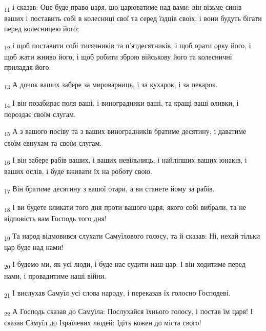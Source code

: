 \begin{tcolorbox}
\textsubscript{11} і сказав: Оце буде право царя, що царюватиме над вами: він візьме синів ваших і поставить собі в колесниці свої та серед їздців своїх, і вони будуть бігати перед колесницею його;
\end{tcolorbox}
\begin{tcolorbox}
\textsubscript{12} і щоб поставити собі тисячників та п'ятдесятників, і щоб орати орку його, і щоб жати жниво його, і щоб робити зброю військову його та колесничні приладдя його.
\end{tcolorbox}
\begin{tcolorbox}
\textsubscript{13} А дочок ваших забере за мироварниць, і за кухарок, і за пекарок.
\end{tcolorbox}
\begin{tcolorbox}
\textsubscript{14} І він позабирає поля ваші, і виноградники ваші, та кращі ваші оливки, і пороздає своїм слугам.
\end{tcolorbox}
\begin{tcolorbox}
\textsubscript{15} А з вашого посіву та з ваших виноградників братиме десятину, і даватиме своїм евнухам та своїм слугам.
\end{tcolorbox}
\begin{tcolorbox}
\textsubscript{16} І він забере рабів ваших, і ваших невільниць, і найліпших ваших юнаків, і ваших ослів, і буде вживати їх на роботу свою.
\end{tcolorbox}
\begin{tcolorbox}
\textsubscript{17} Він братиме десятину з вашої отари, а ви станете йому за рабів.
\end{tcolorbox}
\begin{tcolorbox}
\textsubscript{18} І ви будете кликати того дня проти вашого царя, якого собі вибрали, та не відповість вам Господь того дня!
\end{tcolorbox}
\begin{tcolorbox}
\textsubscript{19} Та народ відмовився слухати Самуїлового голосу, та й сказав: Ні, нехай тільки цар буде над нами!
\end{tcolorbox}
\begin{tcolorbox}
\textsubscript{20} І будемо ми, як усі люди, і буде нас судити наш цар. І він ходитиме перед нами, і провадитиме наші війни.
\end{tcolorbox}
\begin{tcolorbox}
\textsubscript{21} І вислухав Самуїл усі слова народу, і переказав їх голосно Господеві.
\end{tcolorbox}
\begin{tcolorbox}
\textsubscript{22} А Господь сказав до Самуїла: Послухайся їхнього голосу, і постав їм царя! І сказав Самуїл до Ізраїлевих людей: Ідіть кожен до міста свого!
\end{tcolorbox}
